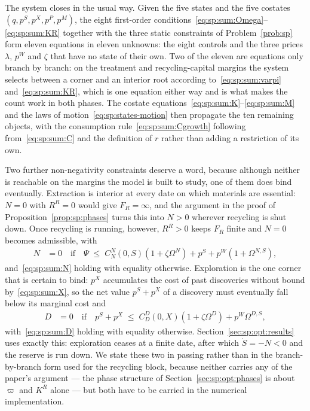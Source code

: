 The system closes in the usual way. Given the five states and the five costates $\left(q,p^S,p^X,p^P,p^M\right)$, the eight first-order conditions~\eqref{eq:sp:sum:Omega}--\eqref{eq:sp:sum:KR} together with the three static constraints of Problem~\ref{prob:sp} form eleven equations in eleven unknowns: the eight controls and the three prices $\lambda$, $p^W$ and $\zeta$ that have no state of their own. Two of the eleven are equations only branch by branch: on the treatment and recycling-capital margins the system selects between a corner and an interior root according to~\eqref{eq:sp:sum:varpi} and~\eqref{eq:sp:sum:KR}, which is one equation either way and is what makes the count work in both phases. The costate equations~\eqref{eq:sp:sum:K}--\eqref{eq:sp:sum:M} and the laws of motion~\eqref{eq:sp:states-motion} then propagate the ten remaining objects, with the consumption rule~\eqref{eq:sp:sum:Cgrowth} following from~\eqref{eq:sp:sum:C} and the definition of $r$ rather than adding a restriction of its own.

 Two further non-negativity constraints deserve a
word, because although neither is reachable on the margins the model is built to study, one of them
does bind eventually. Extraction is interior at every date on which materials are essential: $N=0$
with $R^R=0$ would give $F_R=\infty$, and the argument in the proof of
Proposition~\ref{prop:sp:phases} turns this into $N>0$ wherever recycling is shut down. Once recycling
is running, however, $R^R>0$ keeps $F_R$ finite and $N=0$ becomes admissible, with
\begin{align}
N &= 0
\quad\text{if}\quad
\Psi \;\le\; C^N_N\left(0,S\right)\left(1+\zeta\Omega^N\right)+p^S+p^W\left(1+\Omega^{N,S}\right),
\label{eq:sp:sum:N-corner}
\end{align}
and~\eqref{eq:sp:sum:N} holding with equality otherwise. Exploration is the one corner that is
certain to bind: $p^X$ accumulates the cost of past discoveries without bound
by~\eqref{eq:sp:sum:X}, so the net value $p^S+p^X$ of a discovery must eventually fall below its
marginal cost and
\begin{align}
D &= 0
\quad\text{if}\quad
p^S+p^X \;\le\; C^D_D\left(0,X\right)\left(1+\zeta\Omega^D\right)+p^W\Omega^{D,S},
\label{eq:sp:sum:D-corner}
\end{align}
with~\eqref{eq:sp:sum:D} holding with equality otherwise. Section~\ref{sec:sp:opt:results} uses
exactly this: exploration ceases at a finite date, after which $\dot S=-N<0$ and the reserve is run
down. We state these two in passing rather than in the branch-by-branch form used for the recycling
block, because neither carries any of the paper's argument --- the phase structure of
Section~\ref{sec:sp:opt:phases} is about $\varpi$ and $K^R$ alone --- but both have to be carried in
the numerical implementation.

